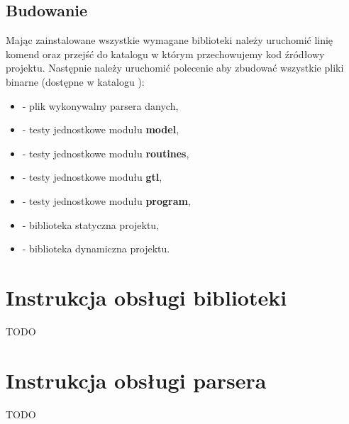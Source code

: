 \documentclass{standalone}
\begin{document}
\section{Budowanie}

Mając zainstalowane wszystkie wymagane biblioteki należy uruchomić linię komend oraz przejść do katalogu w którym
przechowujemy kod źródłowy projektu. Następnie należy uruchomić polecenie  aby zbudować wszystkie
pliki binarne (dostępne w katalogu \CODE{\\bin}):
\begin{itemize}
\item {} - plik wykonywalny parsera danych,
\item {} - testy jednostkowe modułu \textbf{model},
\item {} - testy jednostkowe modułu \textbf{routines},
\item {} - testy jednostkowe modułu \textbf{gtl},
\item {} - testy jednostkowe modułu \textbf{program},
\item {} - biblioteka statyczna projektu,
\item {} - biblioteka dynamiczna projektu.
\end{itemize}

\chapter{Instrukcja obsługi biblioteki}

TODO

\chapter{Instrukcja obsługi parsera}

TODO
\end{document}
